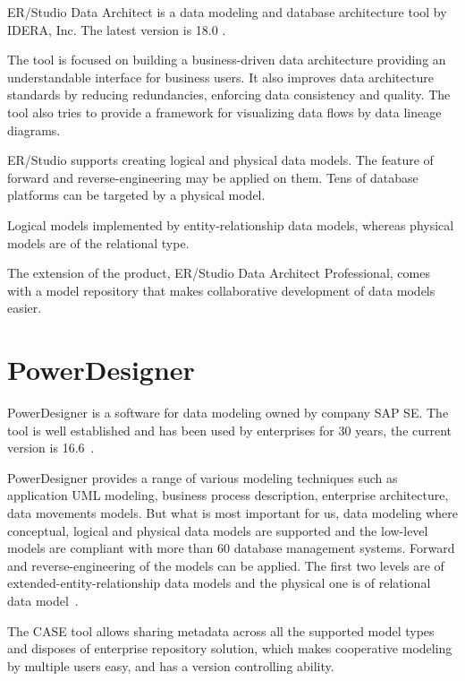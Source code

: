 ER/Studio Data Architect is a data modeling and database architecture tool by IDERA, Inc. 
The latest version is 18.0 \cite{ErStudio}.

The tool is focused on building a business-driven data architecture providing an understandable interface for business users. It also improves data architecture standards by reducing redundancies, enforcing data consistency and quality.
The tool also tries to provide a framework for visualizing data flows by data lineage diagrams. 

ER/Studio supports creating logical and physical data models. The feature of forward and reverse-engineering may be applied on them. Tens of database platforms can be targeted by a physical model.

Logical models implemented by entity-relationship data models, whereas physical models are of the relational type.

The extension of the product, ER/Studio Data Architect Professional, comes with a model repository that makes collaborative development of data models easier. 

\section{PowerDesigner}

PowerDesigner is a software for data modeling owned by company SAP SE. The tool is well established and has been used by enterprises for 30 years, the current version is 16.6~\cite{PowerDesignerHistory}.

PowerDesigner provides a range of various modeling techniques such as application UML modeling, business process description, enterprise architecture, data movements models. But what is most important for us, data modeling where conceptual, logical and physical data models are supported and the low-level models are compliant with more than 60 database management systems.
Forward and reverse-engineering of the models can be applied.
The first two levels are of extended-entity-relationship data models and the physical one is of relational data model~\cite{PowerDesignerFeatures}.

The CASE tool allows sharing metadata across all the supported model types and disposes of enterprise repository solution, which makes cooperative modeling by multiple users easy, and has a version controlling ability.